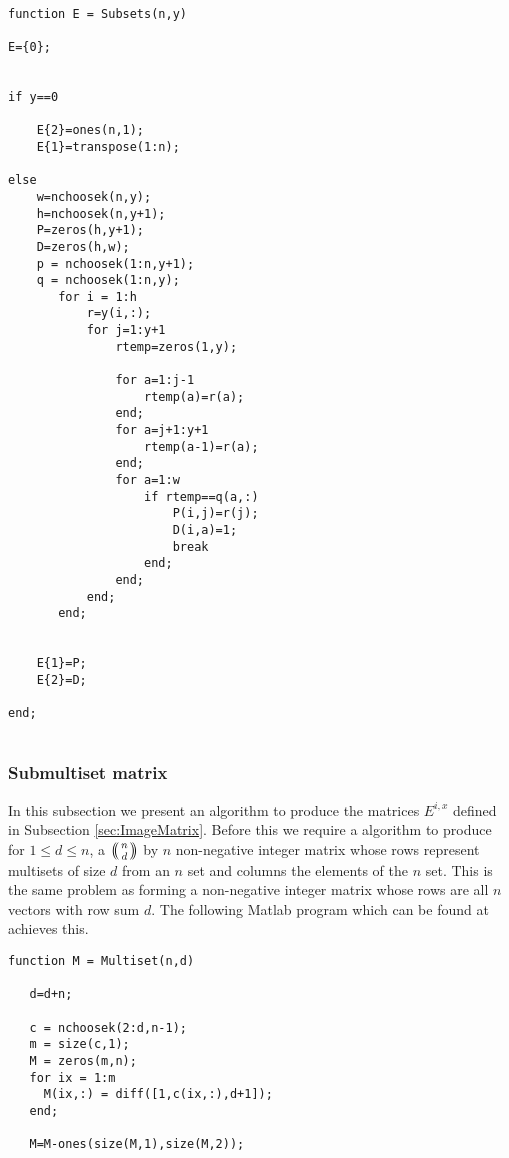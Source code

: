 \documentclass{article}
\theoremstyle{plain}
\theoremstyle{definition}
\numberwithin{thm}{section}
\begin{document}
				\begin{lstlisting}[frame=single]
				
function E = Subsets(n,y)
 
E={0};
 
 
if y==0
 
    E{2}=ones(n,1);
    E{1}=transpose(1:n);
    
else
    w=nchoosek(n,y);
    h=nchoosek(n,y+1);
    P=zeros(h,y+1); 
    D=zeros(h,w); 
    p = nchoosek(1:n,y+1);
    q = nchoosek(1:n,y);
       for i = 1:h 
           r=y(i,:);
           for j=1:y+1 
               rtemp=zeros(1,y);
               
               for a=1:j-1
                   rtemp(a)=r(a);
               end;
               for a=j+1:y+1
                   rtemp(a-1)=r(a);
               end;
               for a=1:w 
                   if rtemp==q(a,:)
                       P(i,j)=r(j);
                       D(i,a)=1;   
                       break 
                   end;
               end;
           end;
       end;
    
    
    E{1}=P;
    E{2}=D;
    
end;
				
				\end{lstlisting}
			
				
			\subsubsection{Submultiset matrix}\label{sec:SubMulti}
			
				In this subsection we present an algorithm to produce the matrices $E^{i,x}$ defined in Subsection \ref{sec:ImageMatrix}.
				Before this we require a algorithm to produce for $1\leq d \leq n$, a ${\ensuremath{\left(\kern-.3em\left(\genfrac{}{}{0pt}{}{{n}}{{d}}\right)\kern-.3em\right)}}$ by $n$ non-negative integer matrix
				whose rows represent multisets of size $d$ from an $n$ set and columns the elements of the $n$ set.
				This is the same problem as forming a non-negative integer matrix whose rows are all $n$ vectors with row sum $d$.
				The following Matlab program which can be found at \cite{MultisetPage} achieves this.
				
				\begin{lstlisting}[frame=single]
function M = Multiset(n,d)

   d=d+n;

   c = nchoosek(2:d,n-1);
   m = size(c,1);
   M = zeros(m,n);
   for ix = 1:m
     M(ix,:) = diff([1,c(ix,:),d+1]);
   end;

   M=M-ones(size(M,1),size(M,2));
				\end{lstlisting}
			
\end{document}
